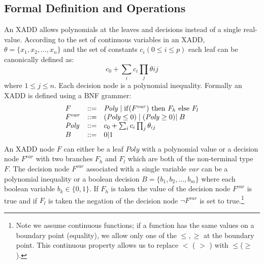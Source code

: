 \documentclass[twoside,11pt]{article}
\begin{document}
\subsection{Formal Definition and Operations}
An XADD allows polynomials at the leaves and decisions instead of a single real-value.  According to the set of continuous variables in an XADD, $\theta = \lbrace x_1,x_2,...,x_n\rbrace$ and the set of constants $c_i (0 \leq i \leq p)$ each leaf can be canonically defined as:
\begin{equation}
c_0+\sum_{i} c_i \prod_j \theta{ij}
\nonumber
\end{equation}
where $ 1 \leq j \leq n $. Each decision node is a polynomial inequality. Formally an XADD is defined using a BNF grammer: 
\begin{equation}
\nonumber
\begin{array}{lll}
F&::=&  \mathit{Poly}  \hspace{1mm} \vert  \hspace{1mm} \mathrm{if} (F^{var})\ \mathrm{then}\ F_h\ \mathrm{else}\ F_l \\
F^{var}&::=& ( \mathit{Poly} \leq 0)  \hspace{1mm}\vert \hspace{1mm}
 ( \mathit{Poly} \geq 0) \vert \hspace{1mm} B\\
\mathit{Poly}&::=&c_0+\sum_{i} c_i \prod_j \theta_{ij}\\
B&::=& 0|1
\end{array}
\end{equation}
An XADD node $F$ can either be a leaf $\mathit{Poly}$ with a polynomial value or a decision node $F^{var}$ with two branches $F_h$ and $F_l$ which are both of the non-terminal type $F$. The decision node $F^{var}$ associated with a single variable $var$ can be a polynomial inequality or a boolean decision $B = \lbrace b_1,b_2,...,b_m \rbrace$ where each boolean variable $b_k \in \lbrace 0,1 \rbrace$. If $F_h$ is taken the value of the decision node $F^{var}$ is true and if $F_l$ is taken the negation of the decision node $\neg F^{var}$ is set to true.\footnote {Note we assume continuous functions; if a function has the same values on a boundary point (equality), we allow only one of the $\leq, \geq$ at the boundary point. This continuous property allows us to replace $<$ ( $>$ ) with $\leq$($\geq$).} 
\end{document}
